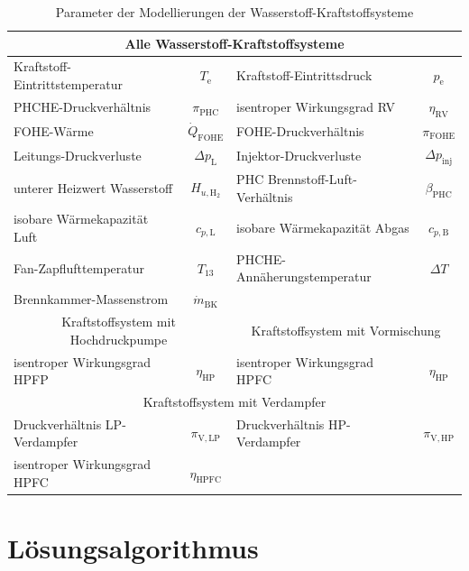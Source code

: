 \begin{table}[ht]
    \centering
	\caption{Parameter der Modellierungen der Wasserstoff-Kraftstoffsysteme}
	\begin{tabular} {|l|c|l|c|} \hline%
    \multicolumn{4}{|c|}{Alle Wasserstoff-Kraftstoffsysteme} \\ \hline\hline%
    Kraftstoff-Eintrittstemperatur & $T_\mathrm{e}$ & Kraftstoff-Eintrittsdruck & $p_\mathrm{e}$ \\ \hline
    PHCHE-Druckverhältnis  & $\pi_{\mathrm{PHC}}$ & isentroper Wirkungsgrad RV & $\eta_\mathrm{RV}$ \\ \hline
    FOHE-Wärme & $\dot{Q}_{\mathrm{FOHE}}$ & FOHE-Druckverhältnis & $\pi_{\mathrm{FOHE}}$ \\ \hline
    Leitungs-Druckverluste & $\Delta p_{\mathrm{L}}$ & Injektor-Druckverluste & $\Delta p_{\mathrm{inj}}$ \\ \hline
    unterer Heizwert Wasserstoff & $H_{u, \mathrm{H}_2}$ & PHC Brennstoff-Luft-Verhältnis & $\beta_\mathrm{PHC}$ \\ \hline
    isobare Wärmekapazität Luft & $c_{p, \mathrm{L}}$ & isobare Wärmekapazität Abgas & $c_{p, \mathrm{B}}$ \\ \hline
    Fan-Zapflufttemperatur & $T_{13}$ & PHCHE-Annäherungstemperatur & $\Delta T$ \\ \hline
    Brennkammer-Massenstrom & $\dot{m}_\mathrm{BK}$ & \multicolumn{2}{c|}{} \\ \hline\hline
    
	\multicolumn{2}{|c}{Kraftstoffsystem mit Hochdruckpumpe} & \multicolumn{2}{|c|}{Kraftstoffsystem mit Vormischung}\\ \hline\hline%
	isentroper Wirkungsgrad HPFP & $\eta_{\mathrm{HP}}$ & isentroper Wirkungsgrad HPFC & $\eta_{\mathrm{HP}}$ \\ \hline\hline
	
	\multicolumn{4}{|c|}{Kraftstoffsystem mit Verdampfer} \\ \hline \hline
	Druckverhältnis LP-Verdampfer & $\pi_{\mathrm{V,LP}}$ & Druckverhältnis HP-Verdampfer & $\pi_{\mathrm{V,HP}}$ \\ \hline
	isentroper Wirkungsgrad HPFC & $\eta_{\mathrm{HPFC}}$ & \multicolumn{2}{c|}{} \\ \hline
    
   
    \end{tabular}	
    \label{Tab:h2_params}%
\end{table}
\FloatBarrier 


\section{Lösungsalgorithmus}


